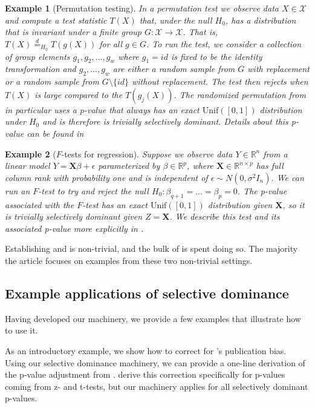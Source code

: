 \documentclass{article}
\newtheorem{example}{Example}
\newcommand{\R}{\mathbb{R}}
\begin{document}
\begin{example}[Permutation testing]
In a permutation test we observe data $X \in \mathcal{X}$ and compute a test statistic $T(X)$ that, under the null $H_0$, has a distribution that is invariant under a finite group $G : \mathcal{X} \rightarrow \mathcal{X}$. That is, $T(X) \overset{d}{=}_{H_0} T(g(X))$ for all $ g \in G$. To run the test, we consider a collection of group elements $g_1, g_2, \dots, g_w$ where $g_1 = id$ is fixed to be the identity transformation and $g_2, \dots, g_w$ are either a random sample from $G$ with replacement or a random sample from $G \setminus \{id \}$ without replacement. The test then rejects when $T(X)$ is large compared to the $T(g_j(X))$. The randomized permutation from \cite{Hemerik} in particular uses a p-value that always has an exact $\text{Unif}([0, 1])$ distribution under $H_0$ and is therefore is trivially selectively dominant. Details about this p-value can be found in 
\end{example}

\begin{example}[$F$-tests for regression]
Suppose we observe data $Y \in \R^n$ from a linear model $Y = \boldsymbol{X} \beta + \epsilon$ parameterized by $\beta \in \R^p$,  where $\boldsymbol{X} \in \R^{n \times p }$ has full column rank with probability one and is independent of $\epsilon \sim N(0, \sigma^2 I_n)$. We can run an $F$-test to try and reject the null $H_0 : \beta_{q+1} = \dots = \beta_p = 0$. The p-value associated with the $F$-test has an exact $\text{Unif}([0, 1])$ distribution given $\boldsymbol{X}$, so it is trivially selectively dominant given $Z = \boldsymbol{X}$. We describe this test and its associated p-value more explicitly in . 
\end{example}

Establishing  and  is non-trivial, and the bulk of  is spent doing so. The majority the article focuses on examples from these two non-trivial settings. 

\subsection{Example applications of selective dominance}

Having developed our machinery, we provide a few examples that illustrate how to use it.

As an introductory example, we show how to correct for 's publication bias. Using our selective dominance machinery, we can provide a one-line derivation of the p-value adjustment from \cite{Hung2020}. \cite{Hung2020} derive this correction specifically for p-values coming from z- and t-tests, but our machinery applies for all selectively dominant p-values. 
\end{document}
